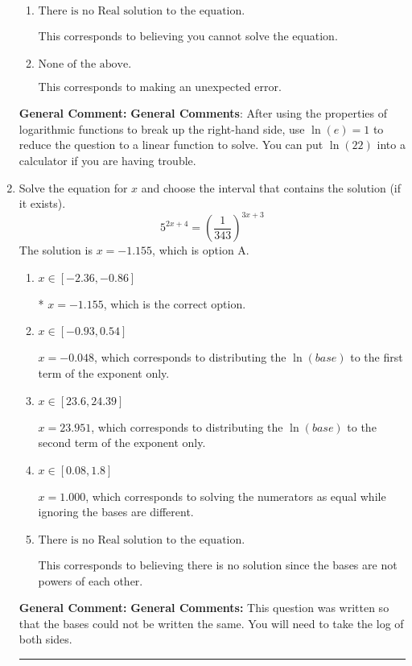 \documentclass{extbook}[14pt]
\newcommand{\litem}[1]{\item #1

\rule{\textwidth}{0.4pt}}
\begin{document}
\begin{enumerate}
{\begin{enumerate}[label=\Alph*.]
$x = -0.600$, which corresponds to treating any root as a square root.
\item \( \text{There is no Real solution to the equation.} \)

This corresponds to believing you cannot solve the equation.
\item \( \text{None of the above.} \)

This corresponds to making an unexpected error.
\end{enumerate}

\textbf{General Comment:} \textbf{General Comments}: After using the properties of logarithmic functions to break up the right-hand side, use $\ln(e) = 1$ to reduce the question to a linear function to solve. You can put $\ln(22)$ into a calculator if you are having trouble.
}
\litem{
Solve the equation for $x$ and choose the interval that contains the solution (if it exists).
\[ 5^{2x+4} = \left(\frac{1}{343}\right)^{3x+3} \]The solution is \( x = -1.155 \), which is option A.\begin{enumerate}[label=\Alph*.]
\item \( x \in [-2.36, -0.86] \)

* $x = -1.155$, which is the correct option.
\item \( x \in [-0.93, 0.54] \)

$x = -0.048$, which corresponds to distributing the $\ln(base)$ to the first term of the exponent only.
\item \( x \in [23.6, 24.39] \)

$x = 23.951$, which corresponds to distributing the $\ln(base)$ to the second term of the exponent only.
\item \( x \in [0.08, 1.8] \)

$x = 1.000$, which corresponds to solving the numerators as equal while ignoring the bases are different.
\item \( \text{There is no Real solution to the equation.} \)

This corresponds to believing there is no solution since the bases are not powers of each other.
\end{enumerate}

\textbf{General Comment:} \textbf{General Comments:} This question was written so that the bases could not be written the same. You will need to take the log of both sides.
}
\end{enumerate}
\end{document}
